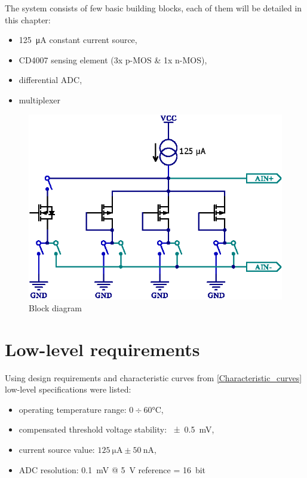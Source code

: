     The system consists of few basic building blocks, each of them will be detailed in this chapter:
    \begin{itemize}
        \item \SI{125}{\uA} constant current source,
        \item CD4007 sensing element (3x p-MOS \& 1x n-MOS),
        \item differential ADC,
        \item multiplexer
    \end{itemize}


    \begin{figure}[H]
        \centering
        \includegraphics[width=0.7\paperwidth]{img/06/CD4007_mux_schematic.eps}
        \caption{Block diagram}
        \label{sensor_block_diagram}
    \end{figure}

\section{Low-level requirements}
    Using design requirements and characteristic curves from \ref{Characteristic_curves} low-level specifications were listed:
    \begin{itemize}
        \item operating temperature range: $0 \div 60 \si{\degreeCelsius}$,
        \item compensated threshold voltage stability: \SI{\pm 0.5}{\milli\volt},
        \item current source value: $\SI{125}{\micro\ampere} \pm \SI{50}{\nano\ampere}$,
        \item ADC resolution: \SI{0.1}{\milli\volt} @ \SI{5}{\volt} reference = \SI{16}{bit}
    \end{itemize}


